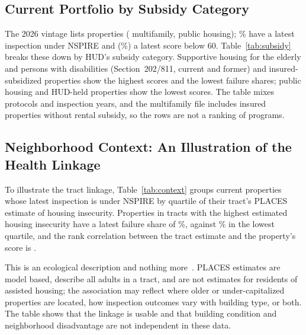 \documentclass[10pt,twocolumn,letterpaper]{article}
\begin{document}
\subsection{Current Portfolio by Subsidy Category}
\begin{table}[t]
\caption{Properties listed in the 2026 vintage by HUD subsidy category, with their latest observed score. Categories with fewer than 100 properties are omitted.}\label{tab:subsidy}
\centering\footnotesize
\resizebox{\columnwidth}{!}{}
\end{table}
The 2026 vintage lists \curProps{} properties (\curMF{} multifamily, \curPH{} public housing); \curNspirePct\% have a latest inspection under NSPIRE and \curFailN{} (\curFailPct\%) a latest score below 60. Table~\ref{tab:subsidy} breaks these down by HUD's subsidy category. Supportive housing for the elderly and persons with disabilities (Section~202/811, current and former) and insured-subsidized properties show the highest scores and the lowest failure shares; public housing and HUD-held properties show the lowest scores. The table mixes protocols and inspection years, and the multifamily file includes insured properties without rental subsidy, so the rows are not a ranking of programs.

\subsection{Neighborhood Context: An Illustration of the Health Linkage}
To illustrate the tract linkage, Table~\ref{tab:context} groups current properties whose latest inspection is under NSPIRE by quartile of their tract's PLACES estimate of housing insecurity. Properties in tracts with the highest estimated housing insecurity have a latest failure share of \ctxFailHigh\%, against \ctxFailLow\% in the lowest quartile, and the rank correlation between the tract estimate and the property's score is \ctxSpearman{}.

\begin{table}[t]
\caption{Current properties with a latest NSPIRE inspection, by quartile of tract housing insecurity (CDC PLACES 2025, crude prevalence among adults). Asthma is the mean tract prevalence of current asthma.}\label{tab:context}
\centering\footnotesize
\resizebox{\columnwidth}{!}{}
\end{table}

This is an ecological description and nothing more~\cite{robinson1950}. PLACES estimates are model based, describe all adults in a tract, and are not estimates for residents of assisted housing; the association may reflect where older or under-capitalized properties are located, how inspection outcomes vary with building type, or both. The table shows that the linkage is usable and that building condition and neighborhood disadvantage are not independent in these data.
\end{document}
